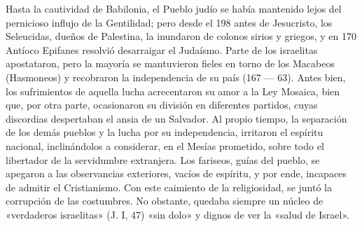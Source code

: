 \raggedbottom{} \documentclass[12pt, a4paper, openany]{book} %
\begin{document}
Hasta la cautividad de Babilonia, el Pueblo judío se había mantenido lejos del pernicioso influjo de la Gentilidad; pero desde el 198 antes de Jesucristo, los Seleucidas, dueños de Palestina, la inundaron de colonos sirios y griegos, y en 170 Antíoco Epifanes resolvió desarraigar el Judaísmo. Parte de los israelitas apostataron, pero la mayoría se mantuvieron fieles en torno de los Macabeos (Hasmoneos) y recobraron la independencia de su país (167 --- 63). Antes bien, los sufrimientos de aquella lucha acrecentaron su amor a la Ley Mosaica, bien que, por otra parte, ocasionaron su división en diferentes partidos, cuyas discordias despertaban el ansia de un Salvador. Al propio tiempo, la separación de los demás pueblos y la lucha por su independencia, irritaron el espíritu nacional, inclinándolos a considerar, en el Mesías prometido, sobre todo el libertador de la servidumbre extranjera. Los fariseos, guías del pueblo, se apegaron a las observancias exteriores, vacíos de espíritu, y por ende, incapaces de admitir el Cristianismo. Con este caimiento de la religiosidad, se juntó la corrupción de las costumbres. No obstante, quedaba siempre un núcleo de «verdaderos israelitas» (J. I, 47) «sin dolo» y dignos de ver la «salud de Israel».
\end{document}
